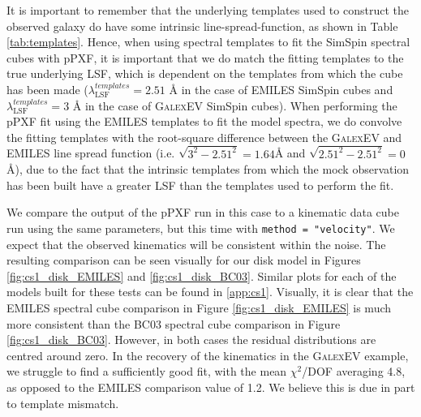 \documentclass[
  journal=pasa,
  manuscript=research-paper, %
  year=2020,
  volume=37,
]{cup-journal}
\begin{document}
It is important to remember that the underlying templates used to construct the observed galaxy do have some intrinsic line-spread-function, as shown in Table \ref{tab:templates}.
Hence, when using spectral templates to fit the SimSpin spectral cubes with pPXF, it is important that we do match the fitting templates to the true underlying LSF, which is dependent on the templates from which the cube has been made ($\lambda_{\text{LSF}}^{templates} = 2.51$ \AA{} in the case of EMILES SimSpin cubes and $\lambda_{\text{LSF}}^{templates} = 3$ \AA{} in the case of \textsc{GalexEV} SimSpin cubes). 
When performing the pPXF fit using the EMILES templates to fit the model spectra, we do convolve the fitting templates with the root-square difference between the \textsc{GalexEV} and EMILES line spread function (i.e. $\sqrt{3^{2} - 2.51^{2}} = 1.64$\AA{} and $\sqrt{2.51^{2} - 2.51^{2}} = 0$\AA), due to the fact that the intrinsic templates from which the mock observation has been built have a greater LSF than the templates used to perform the fit. 

We compare the output of the pPXF run in this case to a kinematic data cube run using the same parameters, but this time with \texttt{method = "velocity"}. 
We expect that the observed kinematics will be consistent within the noise. 
The resulting comparison can be seen visually for our disk model in Figures \ref{fig:cs1_disk_EMILES} and \ref{fig:cs1_disk_BC03}. 
Similar plots for each of the models built for these tests can be found in \ref{app:cs1}.
Visually, it is clear that the EMILES spectral cube comparison in Figure \ref{fig:cs1_disk_EMILES} is much more consistent than the BC03 spectral cube comparison in Figure \ref{fig:cs1_disk_BC03}. 
However, in both cases the residual distributions are centred around zero. 
In the recovery of the kinematics in the \textsc{GalexEV} example, we struggle to find a sufficiently good fit, with the mean $\chi^2$/DOF averaging 4.8, as opposed to the EMILES comparison value of 1.2. 
We believe this is due in part to template mismatch. 
\end{document}
